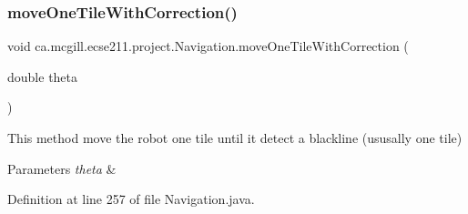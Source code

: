 \subsubsection{\texorpdfstring{move\+One\+Tile\+With\+Correction()}{moveOneTileWithCorrection()}}
{\footnotesize\ttfamily void ca.\+mcgill.\+ecse211.\+project.\+Navigation.\+move\+One\+Tile\+With\+Correction (\begin{DoxyParamCaption}\item[{double}]{theta }\end{DoxyParamCaption})}

This method move the robot one tile until it detect a blackline (ususally one tile)


\begin{DoxyParams}{Parameters}
{\em theta} & \\
\hline
\end{DoxyParams}


Definition at line 257 of file Navigation.\+java.


